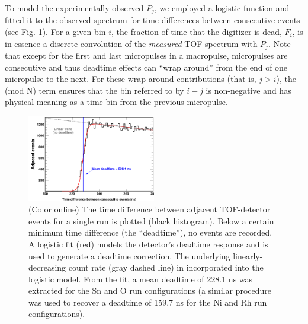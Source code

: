 \documentclass[twocolumn,secnumarabic,amssymb, nobibnotes, aps, prl,
superscriptaddress, nobalancelastpage]{revtex4}
\begin{document}
To model the experimentally-observed $P_{j}$, we
employed a logistic function and fitted it to the observed spectrum for time
differences between consecutive events (see Fig.
\ref{TimeDifferenceBetweenEvents}). For a given bin $i$, the fraction of time that the 
digitizer is dead, $F_{i}$, is in essence a discrete convolution of the
\textit{measured} TOF spectrum with $P_{j}$. Note that except for the first and
last micropulses in a macropulse, micropulses are consecutive and thus deadtime effects can
``wrap around'' from the end of one micropulse to the next. For these wrap-around
contributions (that is, $j>i$), the (mod N) term ensures that the bin referred
to by $i-j$ is non-negative and has physical meaning as a time bin from the 
previous micropulse.

\begin{figure}
    \includegraphics[width=0.5\textwidth]{figures/TimeDifferenceBetweenEvents.png}
    \caption{(Color online) The time difference between adjacent TOF-detector
    events for a single run is plotted (black histogram). Below a certain
minimum time difference (the ``deadtime''), no events are recorded. A logistic
fit (red) models the detector's deadtime response and is used to generate a
deadtime correction. The underlying linearly-decreasing count rate (gray dashed
line) in incorporated into the logistic model. From the fit, a mean deadtime of
228.1 ns was extracted for the Sn and O run configurations (a similar
procedure was used to recover a deadtime of 159.7 ns for the Ni and Rh
run configurations).}
    \label{TimeDifferenceBetweenEvents}
\end{figure}
\end{document}
